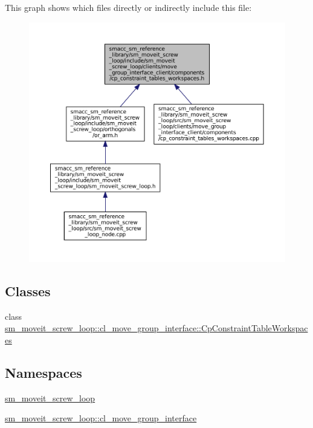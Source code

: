 This graph shows which files directly or indirectly include this file\+:
\nopagebreak
\begin{figure}[H]
\begin{center}
\leavevmode
\includegraphics[width=350pt]{sm__moveit__screw__loop_2include_2sm__moveit__screw__loop_2clients_2move__group__interface__cliebeea783a55e09ec0a8aea14c54033771}
\end{center}
\end{figure}
\subsection*{Classes}
\begin{DoxyCompactItemize}
\item 
class \hyperlink{classsm__moveit__screw__loop_1_1cl__move__group__interface_1_1CpConstraintTableWorkspaces}{sm\+\_\+moveit\+\_\+screw\+\_\+loop\+::cl\+\_\+move\+\_\+group\+\_\+interface\+::\+Cp\+Constraint\+Table\+Workspaces}
\end{DoxyCompactItemize}
\subsection*{Namespaces}
\begin{DoxyCompactItemize}
\item 
 \hyperlink{namespacesm__moveit__screw__loop}{sm\+\_\+moveit\+\_\+screw\+\_\+loop}
\item 
 \hyperlink{namespacesm__moveit__screw__loop_1_1cl__move__group__interface}{sm\+\_\+moveit\+\_\+screw\+\_\+loop\+::cl\+\_\+move\+\_\+group\+\_\+interface}
\end{DoxyCompactItemize}
